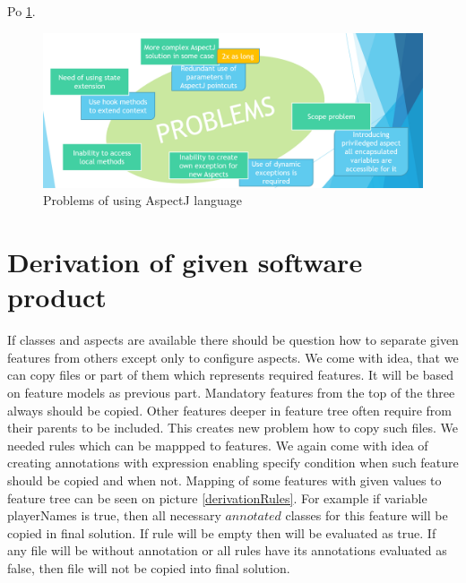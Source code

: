 \documentclass[11pt,slovak,a4paper,twoside]{article}
\begin{document}
Po  \ref{problemsOfAspectJ}.

\begin{figure}[H]  %
					\begin{center}
									\includegraphics[width=\linewidth]{fig/problemsOfAspectJEN.png}
									\caption{Problems of using AspectJ language}
									\label{problemsOfAspectJ}
					\end{center}
\end{figure}



\section{Derivation of given software product} \label{gameDerivation}

If classes and aspects are available there should be question how to separate given features from others except only to configure aspects. We come with idea, that we can copy files or part of them which represents required features. It will be based on feature models as previous part. Mandatory features from the top of the three always should be copied. Other features deeper in feature tree often require from their parents to be included. This creates new problem how to copy such files. We needed rules which can be mappped to features. We again come with idea of creating annotations with expression enabling specify condition when such feature should be copied and when not. Mapping of some features with given values to feature tree can be seen on picture \ref{derivationRules}. For example if variable playerNames is true, then all necessary \(annotated\) classes for this feature will be copied in final solution. If rule will be empty then will be evaluated as true. If any file will be without annotation or all rules have its annotations evaluated as false, then file will not be copied into final solution.
\end{document}
